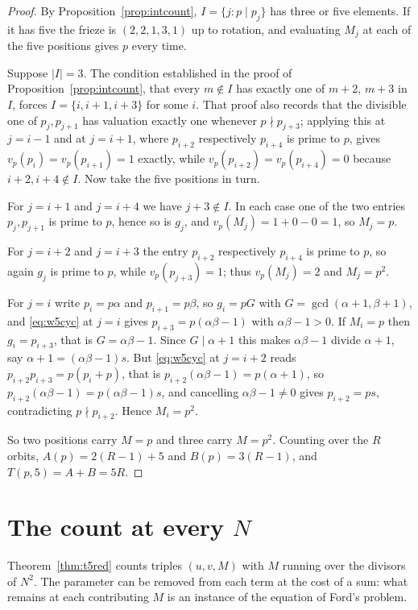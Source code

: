 \documentclass[11pt]{article}
\theoremstyle{plain}
\theoremstyle{definition}
\begin{document}
\begin{proof}
By Proposition~\ref{prop:intcount}, $I=\{j:p\mid p_j\}$ has three or five elements. If it
has five the frieze is $(2,2,1,3,1)$ up to rotation, and evaluating $M_j$ at each of the
five positions gives $p$ every time.

Suppose $|I|=3$. The condition established in the proof of
Proposition~\ref{prop:intcount}, that every $m\notin I$ has exactly one of $m+2$, $m+3$ in
$I$, forces $I=\{i,i+1,i+3\}$ for some $i$. That proof also records that the divisible one of
$p_j,p_{j+1}$ has valuation exactly one whenever $p\nmid p_{j+3}$; applying this at $j=i-1$
and at $j=i+1$, where $p_{i+2}$ respectively $p_{i+4}$ is prime to $p$, gives
$v_p(p_i)=v_p(p_{i+1})=1$ exactly, while $v_p(p_{i+2})=v_p(p_{i+4})=0$ because
$i+2,i+4\notin I$. Now take the five positions in turn.

For $j=i+1$ and $j=i+4$ we have $j+3\notin I$. In each case one of the two entries
$p_j,p_{j+1}$ is prime to $p$, hence so is $g_j$, and $v_p(M_j)=1+0-0=1$, so $M_j=p$.

For $j=i+2$ and $j=i+3$ the entry $p_{i+2}$ respectively $p_{i+4}$ is prime to $p$, so
again $g_j$ is prime to $p$, while $v_p(p_{j+3})=1$; thus $v_p(M_j)=2$ and $M_j=p^2$.

For $j=i$ write $p_i=p\alpha$ and $p_{i+1}=p\beta$, so $g_i=pG$ with
$G=\gcd(\alpha+1,\beta+1)$, and \eqref{eq:w5cyc} at $j=i$ gives $p_{i+3}=p(\alpha\beta-1)$
with $\alpha\beta-1>0$. If $M_i=p$ then $g_i=p_{i+3}$, that is $G=\alpha\beta-1$. Since
$G\mid\alpha+1$ this makes $\alpha\beta-1$ divide $\alpha+1$, say
$\alpha+1=(\alpha\beta-1)s$. But \eqref{eq:w5cyc} at $j=i+2$ reads
$p_{i+2}p_{i+3}=p(p_i+p)$, that is $p_{i+2}(\alpha\beta-1)=p(\alpha+1)$, so
$p_{i+2}(\alpha\beta-1)=p(\alpha\beta-1)s$, and cancelling $\alpha\beta-1\ne0$ gives
$p_{i+2}=ps$, contradicting $p\nmid p_{i+2}$. Hence $M_i=p^2$.

So two positions carry $M=p$ and three carry $M=p^2$. Counting over the $R$ orbits,
$A(p)=2(R-1)+5$ and $B(p)=3(R-1)$, and $T(p,5)=A+B=5R$.
\end{proof}

\section{The count at every $N$}\label{sec:ford}

Theorem~\ref{thm:t5red} counts triples $(u,v,M)$ with $M$ running over the divisors of
$N^2$. The parameter can be removed from each term at the cost of a sum: what remains at
each contributing $M$ is an instance of the equation of Ford's problem.
\end{document}
